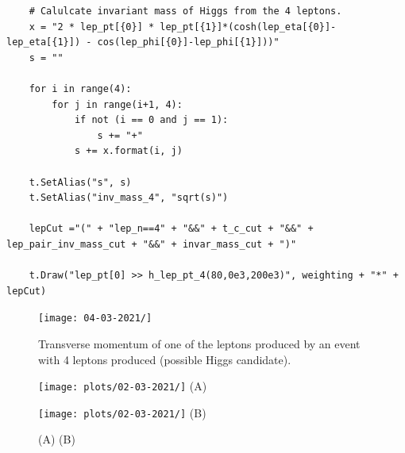 \begin{lstlisting}
    # Calulcate invariant mass of Higgs from the 4 leptons.
    x = "2 * lep_pt[{0}] * lep_pt[{1}]*(cosh(lep_eta[{0}]-lep_eta[{1}]) - cos(lep_phi[{0}]-lep_phi[{1}]))"
    s = ""

    for i in range(4):
        for j in range(i+1, 4):
            if not (i == 0 and j == 1):
                s += "+"
            s += x.format(i, j)
 
    t.SetAlias("s", s)
    t.SetAlias("inv_mass_4", "sqrt(s)")

    lepCut ="(" + "lep_n==4" + "&&" + t_c_cut + "&&" + lep_pair_inv_mass_cut + "&&" + invar_mass_cut + ")"
    
    t.Draw("lep_pt[0] >> h_lep_pt_4(80,0e3,200e3)", weighting + "*" + lepCut)
\end{lstlisting}


\begin{figure}[h!]
    \centering
	\texttt{[image: 04-03-2021/]}
    \caption{Transverse momentum of one of the leptons produced by an event with 4 leptons produced (possible Higgs candidate).} 
    \label{fig:16:19_04-03-21}
\end{figure}


\begin{figure}[h!]
    \centering
    \begin{minipage}{0.5\textwidth}
        \centering
        \texttt{[image: plots/02-03-2021/]}
        (A)
    \end{minipage}\hfill
    \begin{minipage}{0.5\textwidth}
        \centering
        \texttt{[image: plots/02-03-2021/]}
        (B)
    \end{minipage}
    \caption{(A)  (B)}
    \label{}
\end{figure}